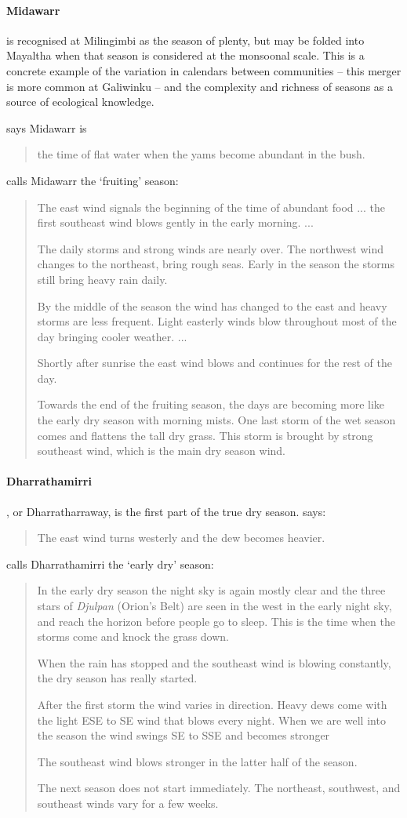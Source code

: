 \paragraph{Midawarr} is recognised at Milingimbi as the season of plenty,
but may be folded into Mayaltha when that season is considered at the
monsoonal scale.  This is a concrete example of the variation in calendars
between communities -- this merger is more common at Galiwinku -- and the
complexity and richness of seasons as a source of ecological knowledge.

\citet[][p36]{atlas2014} says Midawarr is \blockquote{
    the time of flat water when the yams become abundant in the bush.
}
\citet{davis1989} calls Midawarr the `fruiting' season:
\blockquote{
    The east wind signals the beginning of the time of abundant food ...
    the first southeast wind blows gently in the early morning. ...

    The daily storms and strong winds are nearly over.
    The northwest wind changes to the northeast, bring rough seas.
    Early in the season the storms still bring heavy rain daily.

    By the middle of the season the wind has changed to the east and heavy storms are less frequent.
    Light easterly winds blow throughout most of the day bringing cooler weather. ...

    Shortly after sunrise the east wind blows and continues for the rest of the day.

    Towards the end of the fruiting season, the days are becoming
    more like the early dry season with morning mists.
    One last storm of the wet season comes and flattens the tall dry grass.
    This storm is brought by strong southeast wind, which is the main dry season wind.
}


\paragraph{Dharrathamirri}, or Dharratharraway, is the first part of the
true dry season.  \citet[][p36]{atlas2014} says: \blockquote{The east wind
turns westerly and the dew becomes heavier.}.

\citet{davis1989} calls Dharrathamirri the `early dry' season:
\blockquote{
    In the early dry season the night sky is again mostly clear and the three stars of
    \textit{Djulpan} (Orion's Belt) are seen in the west in the early night sky,
    and reach the horizon before people go to sleep.
    This is the time when the storms come and knock the grass down.

    When the rain has stopped and the southeast wind is blowing constantly, the dry season has really started.

    After the first storm the wind varies in direction.
    Heavy dews come with the light ESE to SE wind that blows every night.
    When we are well into the season the wind swings SE to SSE and becomes stronger

    The southeast wind blows stronger in the latter half of the season.

    The next season does not start immediately.
    The northeast, southwest, and southeast winds vary for a few weeks.
}


